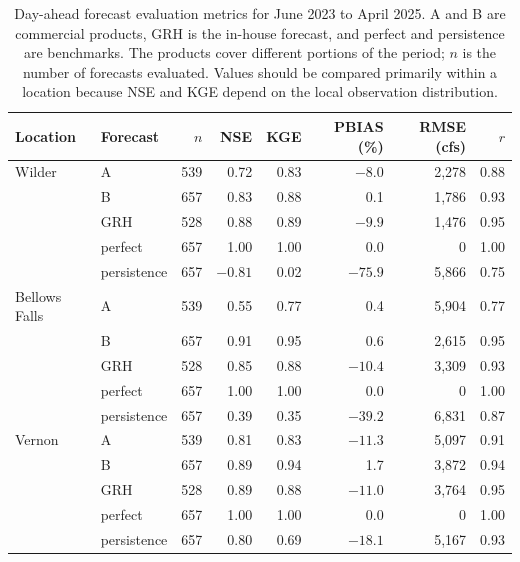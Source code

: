 \documentclass[MLA]{USG} %
\begin{document}
\begin{table}[ht]
\centering
\caption{Day-ahead forecast evaluation metrics for June 2023 to April 2025. A and B are commercial products, GRH is the in-house forecast, and perfect and persistence are benchmarks. The products cover different portions of the period; $n$ is the number of forecasts evaluated. Values should be compared primarily within a location because NSE and KGE depend on the local observation distribution.}\label{tab:metrics}
\begin{tabular}{llrrrrrr}
  \hline
Location & Forecast         & $n$ &   NSE   & KGE  & PBIAS (\%) & RMSE (cfs) & $r$ \\
  \hline
Wilder        & A           & 539 &  0.72   & 0.83 &  $-8.0$ & 2,278 & 0.88 \\
              & B           & 657 &  0.83   & 0.88 &    0.1  & 1,786 & 0.93 \\
              & GRH         & 528 &  0.88   & 0.89 &  $-9.9$ & 1,476 & 0.95 \\
              & perfect     & 657 &  1.00   & 1.00 &    0.0  &     0 & 1.00 \\
              & persistence & 657 & $-0.81$ & 0.02 & $-75.9$ & 5,866 & 0.75 \\
Bellows Falls & A           & 539 &  0.55   & 0.77 &    0.4  & 5,904 & 0.77 \\
              & B           & 657 &  0.91   & 0.95 &    0.6  & 2,615 & 0.95 \\
              & GRH         & 528 &  0.85   & 0.88 & $-10.4$ & 3,309 & 0.93 \\
              & perfect     & 657 &  1.00   & 1.00 &    0.0  &     0 & 1.00 \\
              & persistence & 657 &  0.39   & 0.35 & $-39.2$ & 6,831 & 0.87 \\
Vernon        & A           & 539 &  0.81   & 0.83 & $-11.3$ & 5,097 & 0.91 \\
              & B           & 657 &  0.89   & 0.94 &    1.7  & 3,872 & 0.94 \\
              & GRH         & 528 &  0.89   & 0.88 & $-11.0$ & 3,764 & 0.95 \\
              & perfect     & 657 &  1.00   & 1.00 &    0.0  &     0 & 1.00 \\
              & persistence & 657 &  0.80   & 0.69 & $-18.1$ & 5,167 & 0.93 \\
   \hline
\end{tabular}
\end{table}
\end{document}
